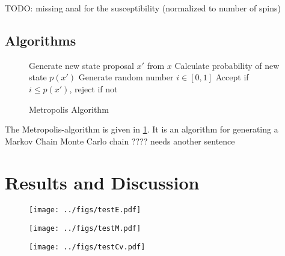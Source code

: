 \documentclass[english,notitlepage,reprint,nofootinbib]{revtex4-1}  %
\begin{document}
TODO: missing anal for the susceptibility (normalized to number of spins)



\subsection*{Algorithms}

\begin{figure}
	\begin{algorithm}[H]
		\caption{Metropolis Algorithm}
		\label{algo:metropolis}
		\begin{algorithmic}
			\State Generate new state proposal $x'$ from $x$
			\State Calculate probability of new state $p(x')$
			\State Generate random number  $i \in [0,1]$
			\State Accept if $i \leq p(x')$, reject if not
			\EndProcedure
		\end{algorithmic}
	\end{algorithm}
\end{figure}

The Metropolis-algorithm is given in \ref{algo:metropolis}. It is an algorithm for generating a Markov Chain Monte Carlo chain ???? needs another sentence
\section{Results and Discussion}\label{sec:results}

\begin{figure}[H]
	\centering
	\texttt{[image: ../figs/testE.pdf]} %
	\caption{}
	\label{fig:testE}
\end{figure}

\begin{figure}[H]
	\centering
	\texttt{[image: ../figs/testM.pdf]} %
	\caption{}
	\label{fig:testM}
\end{figure}

\begin{figure}[H]
	\centering
	\texttt{[image: ../figs/testCv.pdf]} %
	\caption{}
	\label{fig:testCv}
\end{figure}
\end{document}
